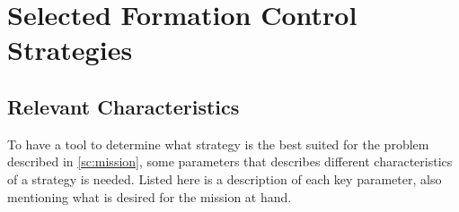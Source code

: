 \chapter{Selected Formation Control Strategies}
\label{ch:selformctrl}


\section{Relevant Characteristics}
To have a tool to determine what strategy is the best suited for the
problem described in \vref{sc:mission}, some parameters that describes
different characteristics of a strategy is needed. Listed here is a
description of each key parameter, also mentioning what is desired for
the mission at hand.

